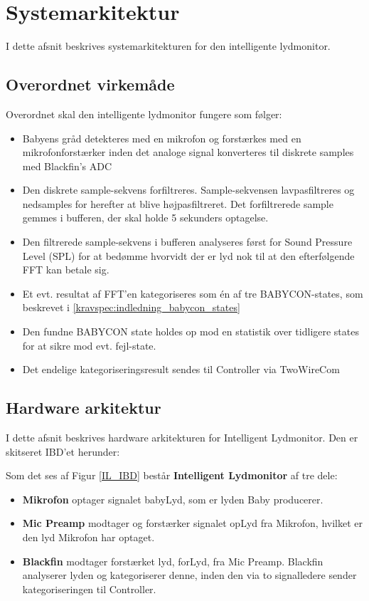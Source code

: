 \newpage
\section{Systemarkitektur}

I dette afsnit beskrives systemarkitekturen for den intelligente lydmonitor.

\subsection*{Overordnet virkemåde}
Overordnet skal den intelligente lydmonitor fungere som følger:
\begin{itemize}
	\item Babyens gråd detekteres med en mikrofon og forstærkes med en mikrofonforstærker inden det analoge signal konverteres til diskrete samples med Blackfin's ADC
	\item Den diskrete sample-sekvens forfiltreres. Sample-sekvensen lavpasfiltreres og nedsamples for herefter at blive højpasfiltreret. Det forfiltrerede sample gemmes i bufferen, der skal holde 5 sekunders optagelse.
	\item Den filtrerede sample-sekvens i bufferen analyseres først for Sound Pressure Level (SPL) for at bedømme hvorvidt der er lyd nok til at den efterfølgende FFT kan betale sig. 
	\item Et evt. resultat af FFT'en kategoriseres som én af tre BABYCON-states, som beskrevet i \ref{kravspec:indledning_babycon_states} 
	\item Den fundne BABYCON state holdes op mod en statistik over tidligere states for at sikre mod evt. fejl-state.
	\item Det endelige kategoriseringsresult sendes til Controller via TwoWireCom
\end{itemize}


\newpage
\subsection{Hardware arkitektur}
I dette afsnit beskrives hardware arkitekturen for Intelligent Lydmonitor. Den er skitseret IBD'et herunder:

Som det ses af Figur \ref{IL_IBD} består \textbf{Intelligent Lydmonitor} af tre dele: 
\begin{itemize}
\item \textbf{Mikrofon} optager signalet babyLyd, som er lyden Baby producerer. 
\item \textbf{Mic Preamp} modtager og forstærker signalet opLyd fra Mikrofon, hvilket er den lyd Mikrofon har optaget. 
\item \textbf{Blackfin} modtager forstærket lyd, forLyd, fra Mic Preamp. Blackfin analyserer lyden og kategoriserer denne, inden den via to signalledere sender kategoriseringen til Controller. 
\end{itemize}


